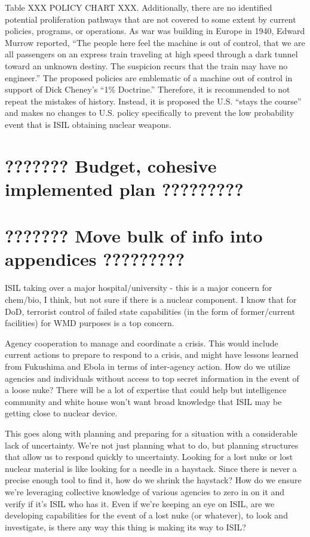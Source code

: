 \documentclass{report}
\begin{document}
Table XXX POLICY CHART XXX.  Additionally, there are no identified potential proliferation pathways that are not covered to some extent by current policies, programs, or operations.  As war was building in Europe in 1940, Edward Murrow reported, \enquote{The people here feel the machine is out of control, that we are all passengers on an express train traveling at high speed through a dark tunnel toward an unknown destiny.  The suspicion recurs that the train may have no engineer.}  The proposed policies are emblematic of a machine out of control in support of Dick Cheney's \enquote{1\% Doctrine.}  Therefore, it is recommended to not repeat the mistakes of history. Instead, it is proposed the U.S. \enquote{stays the course} and makes no changes to U.S. policy specifically to prevent the low probability event that is ISIL obtaining nuclear weapons.





\chapter{???????   Budget, cohesive implemented plan   ?????????}

\chapter{???????   Move bulk of info into appendices    ?????????}


ISIL taking over a major hospital/university - this is a major concern for chem/bio, I think, but not sure if there is a nuclear component. I know that for DoD, terrorist control of failed state capabilities (in the form of former/current facilities) for WMD purposes is a top concern.

Agency cooperation to manage and coordinate a crisis. This would include current actions to prepare to respond to a crisis, and might have lessons learned from Fukushima and Ebola in terms of inter-agency action. How do we utilize agencies and individuals without access to top secret information in the event of a loose nuke? There will be a lot of expertise that could help but intelligence community and white house won't want broad knowledge that ISIL may be getting close to nuclear device. 

This goes along with planning and preparing for a situation with a considerable lack of uncertainty. We're not just planning what to do, but planning structures that allow us to respond quickly to uncertainty. Looking for a lost nuke or lost nuclear material is like looking for a needle in a haystack. Since there is never a precise enough tool to find it, how do we shrink the haystack? How do we ensure we're leveraging collective knowledge of various agencies to zero in on it and verify if it's ISIL who has it. Even if we're keeping an eye on ISIL, are we developing capabilities for the event of a lost nuke (or whatever), to look and investigate, is there any way this thing is making its way to ISIL?
\end{document}
